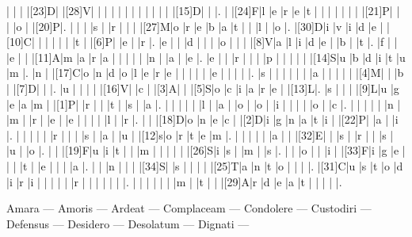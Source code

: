 \documentclass[12pt]{article}
\begin{document}
\begin{Puzzle}{22}{22}
  |{}  |{}  |{}  |[23]D|{}  |[28]V|{}  |{}  |{}  |{}  |{}  |{}  |{}  |{}  |{}  |{}  |{}  |{}  |[15]D|{}  |{}  |.
  |{}  |[24]F|l   |e   |r   |e   |t   |{}  |{}  |{}  |{}  |{}  |{}  |{}  |[21]P|{}  |{}  |{}  |o   |{}  |[20]P|.
  |{}  |{}  |{}  |s   |{}  |r   |{}  |{}  |{}  |[27]M|o   |r   |e   |b   |a   |t   |{}  |{}  |l   |{}  |o   |.
  |[30]D|i   |v   |i   |d   |e   |{}  |[10]C|{}  |{}  |{}  |{}  |{}  |{}  |t   |{}  |[6]P|{}  |e   |{}  |r   |.
  |e   |{}  |{}  |d   |{}  |{}  |{}  |o   |{}  |{}  |{}  |[8]V|a   |l   |i   |d   |e   |{}  |b   |{}  |t   |.
  |f   |{}  |{}  |e   |{}  |{}  |[11]A|m   |a   |r   |a   |{}  |{}  |{}  |{}  |{}  |n   |{}  |a   |{}  |e   |.
  |e   |{}  |{}  |r   |{}  |{}  |{}  |p   |{}  |{}  |{}  |{}  |{}  |[14]S|u   |b   |d   |i   |t   |u   |m   |.
  |n   |{}  |[17]C|o   |n   |d   |o   |l   |e   |r   |e   |{}  |{}  |{}  |{}  |{}  |e   |{}  |{}  |{}  |{}  |.
  |s   |{}  |{}  |{}  |{}  |{}  |{}  |a   |{}  |{}  |{}  |{}  |{}  |[4]M|{}  |{}  |b   |{}  |[7]D|{}  |{}  |.
  |u   |{}  |{}  |{}  |{}  |[16]V|{}  |c   |{}  |[3]A|{}  |{}  |[5]S|o   |c   |i   |a   |r   |e   |{}  |[13]L|.
  |s   |{}  |{}  |{}  |[9]L|u   |g   |e   |a   |m   |{}  |[1]P|{}  |r   |{}  |{}  |t   |{}  |s   |{}  |a   |.
  |{}  |{}  |{}  |{}  |{}  |l   |{}  |a   |{}  |o   |{}  |o   |{}  |i   |{}  |{}  |{}  |{}  |o   |{}  |c   |.
  |{}  |{}  |{}  |{}  |{}  |n   |{}  |m   |{}  |r   |{}  |e   |{}  |e   |{}  |{}  |{}  |{}  |l   |{}  |r   |.
  |{}  |{}  |[18]D|o   |n   |e   |c   |{}  |[2]D|i   |g   |n   |a   |t   |i   |{}  |[22]P|{}  |a   |{}  |i   |.
  |{}  |{}  |{}  |{}  |{}  |r   |{}  |{}  |{}  |s   |{}  |a   |{}  |u   |{}  |[12]s|o   |r   |t   |e   |m   |.
  |{}  |{}  |{}  |{}  |{}  |a   |{}  |{}  |[32]E|{}  |{}  |s   |{}  |r   |{}  |{}  |s   |{}  |u   |{}  |o   |.
  |{}  |{}  |[19]F|u   |i   |t   |{}  |{}  |m   |{}  |{}  |{}  |{}  |{}  |[26]S|i   |s   |{}  |m   |{}  |s   |.
  |{}  |{}  |o   |{}  |{}  |i   |{}  |[33]F|i   |g   |e   |{}  |{}  |{}  |t   |{}  |e   |{}  |{}  |{}  |a   |.
  |{}  |{}  |n   |{}  |{}  |{}  |[34]S|{}  |s   |{}  |{}  |{}  |{}  |[25]T|a   |n   |t   |o   |{}  |{}  |{}  |.
  |[31]C|u   |s   |t   |o   |d   |i   |r   |i   |{}  |{}  |{}  |{}  |{}  |r   |{}  |{}  |{}  |{}  |{}  |{}  |.
  |{}  |{}  |{}  |{}  |{}  |{}  |m   |{}  |t   |{}  |{}  |[29]A|r   |d   |e   |a   |t   |{}  |{}  |{}  |{}  |.
\end{Puzzle}
\begin{rotate}{90}
\small 
Amara --- Amoris --- Ardeat --- Complaceam --- Condolere --- Custodiri --- Defensus --- Desidero --- Desolatum --- Dignati --- 
\end{rotate}
\end{document}
